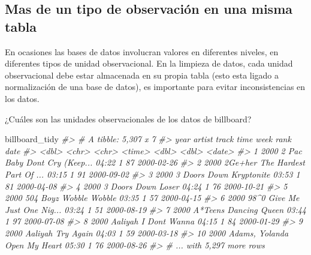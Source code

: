 \documentclass[
]{book}
\newenvironment{Shaded}{\begin{snugshade}}{\end{snugshade}}
\newcommand{\CommentTok}[1]{\textcolor[rgb]{0.56,0.35,0.01}{\textit{#1}}}
\newcommand{\NormalTok}[1]{#1}
\begin{document}
\hypertarget{mas-de-un-tipo-de-observaciuxf3n-en-una-misma-tabla}{%
\subsection*{Mas de un tipo de observación en una misma tabla}\label{mas-de-un-tipo-de-observaciuxf3n-en-una-misma-tabla}}

En ocasiones las bases de datos involucran valores en diferentes niveles, en
diferentes tipos de unidad observacional. En la limpieza de datos, cada unidad
observacional debe estar almacenada en su propia tabla (esto esta ligado a
normalización de una base de datos), es importante para evitar inconsistencias
en los datos.

¿Cuáles son las unidades observacionales de los datos de billboard?

\begin{Shaded}
\begin{Highlighting}[]
\NormalTok{billboard\_tidy}
\CommentTok{\#\textgreater{} \# A tibble: 5,307 x 7}
\CommentTok{\#\textgreater{}     year artist         track                   time    week  rank date      }
\CommentTok{\#\textgreater{}    \textless{}dbl\textgreater{} \textless{}chr\textgreater{}          \textless{}chr\textgreater{}                   \textless{}time\textgreater{} \textless{}dbl\textgreater{} \textless{}dbl\textgreater{} \textless{}date\textgreater{}    }
\CommentTok{\#\textgreater{}  1  2000 2 Pac          Baby Don\textquotesingle{}t Cry (Keep... 04:22      1    87 2000{-}02{-}26}
\CommentTok{\#\textgreater{}  2  2000 2Ge+her        The Hardest Part Of ... 03:15      1    91 2000{-}09{-}02}
\CommentTok{\#\textgreater{}  3  2000 3 Doors Down   Kryptonite              03:53      1    81 2000{-}04{-}08}
\CommentTok{\#\textgreater{}  4  2000 3 Doors Down   Loser                   04:24      1    76 2000{-}10{-}21}
\CommentTok{\#\textgreater{}  5  2000 504 Boyz       Wobble Wobble           03:35      1    57 2000{-}04{-}15}
\CommentTok{\#\textgreater{}  6  2000 98\^{}0           Give Me Just One Nig... 03:24      1    51 2000{-}08{-}19}
\CommentTok{\#\textgreater{}  7  2000 A*Teens        Dancing Queen           03:44      1    97 2000{-}07{-}08}
\CommentTok{\#\textgreater{}  8  2000 Aaliyah        I Don\textquotesingle{}t Wanna           04:15      1    84 2000{-}01{-}29}
\CommentTok{\#\textgreater{}  9  2000 Aaliyah        Try Again               04:03      1    59 2000{-}03{-}18}
\CommentTok{\#\textgreater{} 10  2000 Adams, Yolanda Open My Heart           05:30      1    76 2000{-}08{-}26}
\CommentTok{\#\textgreater{} \# ... with 5,297 more rows}
\end{Highlighting}
\end{Shaded}
\end{document}
